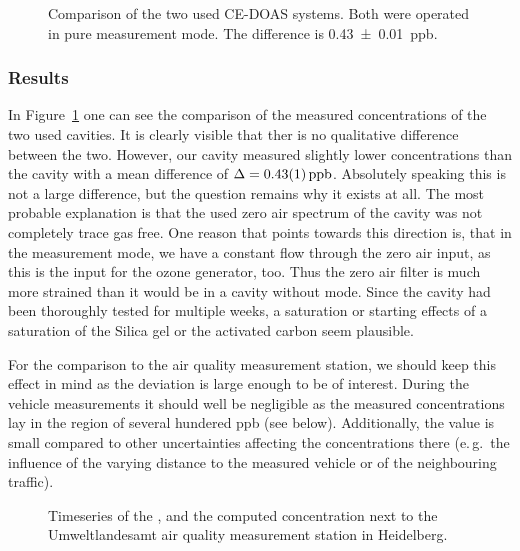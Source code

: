 \begin{figure}[htbp]
  \centering
  
  \caption{Comparison of the two used CE-DOAS systems. Both were
    operated in pure  measurement mode. The difference is
    \SI{0.43 \pm 0.01}{ppb}.}
  \label{fig:hd-comparison}
\end{figure}

\subsubsection{Results}
\label{sec:vehicle-results}

In Figure~\ref{fig:hd-comparison} one can see the comparison of the
measured  concentrations of the two used cavities. It is
clearly visible that ther is no qualitative difference between the
two. However, our  cavity measured slightly lower
concentrations than the  cavity with a mean difference of
$\Delta = \SI{0.43\pm0.01}{ppb}$. Absolutely speaking this is not a
large difference, but the question remains why it exists at all. The
most probable explanation is that the used zero air spectrum of the
 cavity was not completely trace gas free. One reason that
points towards this direction is, that in the  measurement
mode, we have a constant flow through the zero air input, as this is
the input for the ozone generator, too. Thus the zero air filter is much
more strained than it would be in a cavity without 
mode. Since the cavity had been thoroughly tested for multiple
weeks, a saturation or starting effects of a saturation of
the Silica gel or the activated carbon seem plausible.

For the comparison to the air quality measurement station, we should
keep this effect in mind as the deviation is large enough to be of
interest. During the vehicle measurements it should well be
negligible as the measured concentrations lay in the region of several
hundered \si{ppb} (see below). Additionally, the value is small
compared to other uncertainties affecting the concentrations there
(e.\,g.\ the influence of the varying distance to the measured
vehicle or of the neighbouring traffic).

\begin{figure}[htbp]
  \centering
  
  \caption{Timeseries of the ,  and the computed
     concentration next to the Umweltlandesamt air quality
    measurement station in Heidelberg.}
  \label{fig:umba}
\end{figure}


